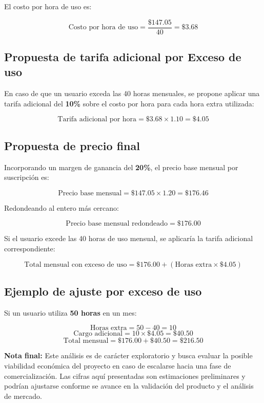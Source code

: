 El costo por hora de uso es:

\[
\text{Costo por hora de uso} = \frac{\$147.05}{40} = \$3.68
\]

\subsection{Propuesta de tarifa adicional por Exceso de uso}

En caso de que un usuario exceda las 40 horas mensuales, se propone aplicar una tarifa adicional del \textbf{10\%} sobre el costo por hora para cada hora extra utilizada:

\[
\text{Tarifa adicional por hora} = \$3.68 \times 1.10 = \$4.05
\]

\subsection{Propuesta de precio final}

Incorporando un margen de ganancia del \textbf{20\%}, el precio base mensual por suscripción es:

\[
\text{Precio base mensual} = \$147.05 \times 1.20 = \$176.46
\]

Redondeando al entero más cercano:

\[
\text{Precio base mensual redondeado} = \$176.00
\]

Si el usuario excede las 40 horas de uso mensual, se aplicaría la tarifa adicional correspondiente:

\[
\text{Total mensual con exceso de uso} = \$176.00 + (\text{Horas extra} \times \$4.05)
\]

\subsection{Ejemplo de ajuste por exceso de uso}

Si un usuario utiliza \textbf{50 horas} en un mes:

\[
\text{Horas extra} = 50 - 40 = 10
\]
\[
\text{Cargo adicional} = 10 \times \$4.05 = \$40.50
\]
\[
\text{Total mensual} = \$176.00 + \$40.50 = \$216.50
\]

\begin{flushleft}
	\textbf{Nota final:} Este análisis es de carácter exploratorio y busca evaluar la posible viabilidad económica del proyecto en caso de escalarse hacia una fase de comercialización. Las cifras aquí presentadas son estimaciones preliminares y podrían ajustarse conforme se avance en la validación del producto y el análisis de mercado.
\end{flushleft}

